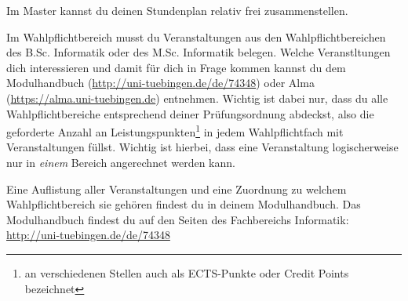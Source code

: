 Im Master kannst du deinen Stundenplan relativ frei zusammenstellen.

\iflehramt
	Im Wahlpflichtbereich musst du Veranstaltungen aus den Wahlpflichtbereichen des B.Sc. Informatik oder des M.Sc. Informatik belegen. 
	Welche Veranstltungen dich interessieren und damit für dich in Frage kommen kannst du dem Modulhandbuch (\url{http://uni-tuebingen.de/de/74348}) oder Alma (\url{https://alma.uni-tuebingen.de}) entnehmen.
\else
	Wichtig ist dabei nur, dass du alle Wahlpflichtbereiche entsprechend deiner Prüfungsordnung abdeckst,
	also die geforderte Anzahl an Leistungspunkten\footnote{an verschiedenen Stellen auch als ECTS-Punkte oder Credit Points bezeichnet}
	in jedem Wahlpflichtfach mit Veranstaltungen füllst. Wichtig ist hierbei, dass eine Veranstaltung logischerweise nur in \emph{einem} Bereich angerechnet
	werden kann.

	Eine Auflistung aller Veranstaltungen und eine Zuordnung zu welchem Wahlpflichtbereich sie gehören
	findest du in deinem Modulhandbuch. Das Modulhandbuch findest du auf den Seiten des Fachbereichs Informatik: \\
	\url{http://uni-tuebingen.de/de/74348}
\fi

